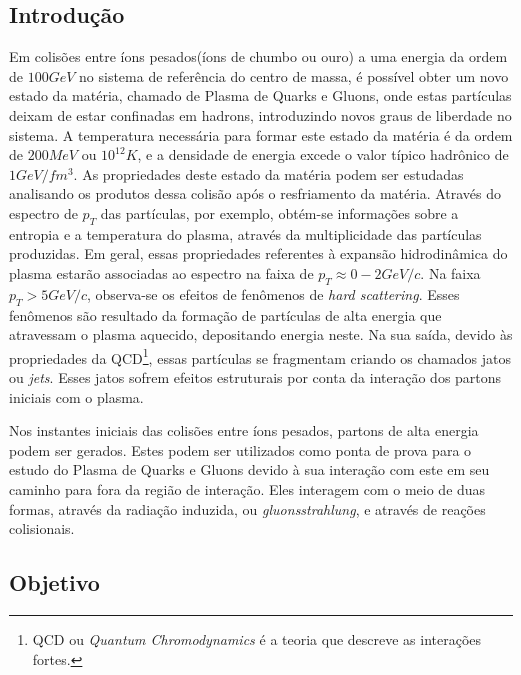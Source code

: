 \subsection{Introdução}

Em colisões entre íons pesados(íons de chumbo ou ouro) a uma energia da ordem de $100 GeV$ no sistema de referência do centro de massa, é possível obter um novo estado da matéria, chamado de Plasma de Quarks e Gluons, onde estas partículas deixam
de estar confinadas em hadrons, introduzindo novos graus de liberdade no sistema. A temperatura necessária para formar este estado da
matéria é da ordem  de $200 MeV$\cite{letessier_hadrons_2002} ou $10^{12} K$, e a densidade de energia excede o valor típico hadrônico de
$1 GeV/fm^{3}$. As propriedades deste estado da matéria podem ser estudadas analisando os produtos dessa colisão após o resfriamento da
matéria. Através do espectro de $p_T$ das partículas, por exemplo, obtém-se informações sobre a
entropia e a temperatura do plasma, através da multiplicidade das partículas produzidas\cite{letessier_hadrons_2002}.
Em geral, essas propriedades referentes à expansão hidrodinâmica do plasma estarão associadas
ao espectro na faixa de $p_T \approx 0-2 GeV/c$. Na faixa $p_T > 5 GeV/c$, observa-se os efeitos de fenômenos de {\it hard
scattering}. Esses fenômenos são resultado da formação de partículas de alta energia que atravessam o plasma aquecido, depositando
energia neste. Na sua saída, devido às propriedades\cite{skands_introduction_2013} da QCD\footnote{QCD ou {\it Quantum Chromodynamics}
é a teoria que descreve as interações fortes.}, essas partículas se fragmentam criando os chamados jatos ou {\it jets}. Esses jatos sofrem efeitos estruturais por conta da interação dos partons
iniciais\cite{lokhtin_angular_1998,bass_systematic_2009,connors_review_2017,nattrass_jet_2018,denterria_jet_2009} com o plasma.

Nos instantes iniciais das colisões entre íons pesados, partons de alta energia podem ser gerados. Estes podem ser utilizados como ponta de prova para o estudo do Plasma de Quarks e Gluons
devido à sua interação com este em seu caminho para fora da região de interação\cite{li_inverting_2017,renk_jet_2014}. Eles
interagem com o meio de duas formas, através da radiação induzida, ou \emph{gluonsstrahlung}, e através de reações colisionais.

\subsection{Objetivo}

